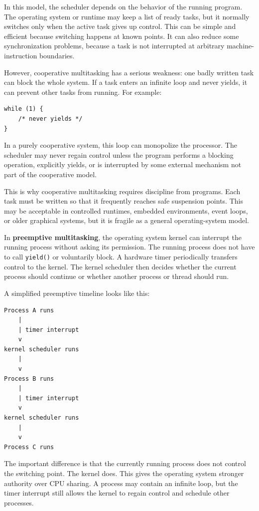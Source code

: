 In this model, the scheduler depends on the behavior of the running program. The operating system or runtime may keep a list of ready tasks, but it normally switches only when the active task gives up control. This can be simple and efficient because switching happens at known points. It can also reduce some synchronization problems, because a task is not interrupted at arbitrary machine-instruction boundaries.

However, cooperative multitasking has a serious weakness: one badly written task can block the whole system. If a task enters an infinite loop and never yields, it can prevent other tasks from running. For example:

\begin{verbatim}
while (1) {
    /* never yields */
}
\end{verbatim}

In a purely cooperative system, this loop can monopolize the processor. The scheduler may never regain control unless the program performs a blocking operation, explicitly yields, or is interrupted by some external mechanism not part of the cooperative model.

This is why cooperative multitasking requires discipline from programs. Each task must be written so that it frequently reaches safe suspension points. This may be acceptable in controlled runtimes, embedded environments, event loops, or older graphical systems, but it is fragile as a general operating-system model.

In \textbf{preemptive multitasking}, the operating system kernel can interrupt the running process without asking its permission. The running process does not have to call \texttt{yield()} or voluntarily block. A hardware timer periodically transfers control to the kernel. The kernel scheduler then decides whether the current process should continue or whether another process or thread should run.

A simplified preemptive timeline looks like this:

\begin{verbatim}
Process A runs
    |
    | timer interrupt
    v
kernel scheduler runs
    |
    v
Process B runs
    |
    | timer interrupt
    v
kernel scheduler runs
    |
    v
Process C runs
\end{verbatim}

The important difference is that the currently running process does not control the switching point. The kernel does. This gives the operating system stronger authority over CPU sharing. A process may contain an infinite loop, but the timer interrupt still allows the kernel to regain control and schedule other processes.

